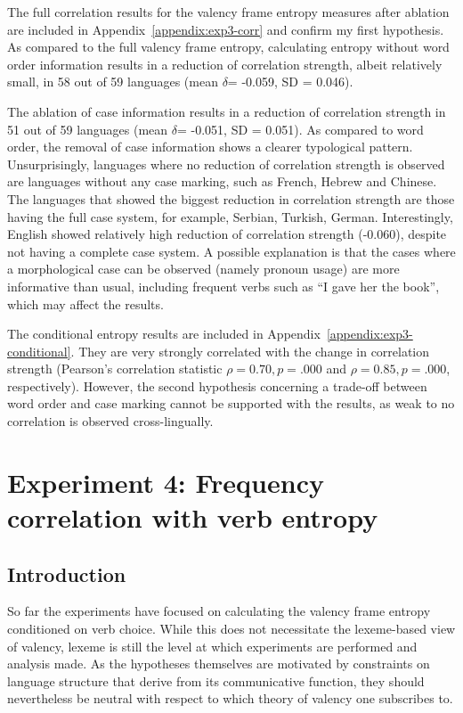 The full correlation results for the valency frame entropy measures after ablation are included in Appendix~\ref{appendix:exp3-corr} and confirm my first hypothesis. As compared to the full valency frame entropy, calculating entropy without word order information results in a reduction of correlation strength, albeit relatively small, in 58 out of 59 languages (mean $\delta$= -0.059, SD = 0.046).

The ablation of case information results in a reduction of correlation strength in 51 out of 59 languages (mean $\delta$= -0.051, SD = 0.051). As compared to word order, the removal of case information shows a clearer typological pattern. Unsurprisingly, languages where no reduction of correlation strength is observed are languages without any case marking, such as French, Hebrew and Chinese. The languages that showed the biggest reduction in correlation strength are those having the full case system, for example, Serbian, Turkish, German. Interestingly, English showed relatively high reduction of correlation strength (-0.060), despite not having a complete case system. A possible explanation is that the cases where a morphological case can be observed (namely pronoun usage) are more informative than usual, including frequent verbs such as ``I gave her the book'', which may affect the results.

The conditional entropy results are included in Appendix~\ref{appendix:exp3-conditional}. They are very strongly correlated with the change in correlation strength (Pearson's correlation statistic $\rho=0.70, p=.000$ and  $\rho=0.85, p=.000$, respectively). However, the second hypothesis concerning a trade-off between word order and case marking cannot be supported with the results, as weak to no correlation is observed cross-lingually.

\section{Experiment 4: Frequency correlation with verb entropy}\label{sec:exp4-verb-entropy}

\subsection{Introduction}

So far the experiments have focused on calculating the valency frame entropy conditioned on verb choice. While this does not necessitate the lexeme-based view of valency, lexeme is still the level at which experiments are performed and analysis made. As the hypotheses themselves are motivated by constraints on language structure that derive from its communicative function, they should nevertheless be neutral with respect to which theory of valency one subscribes to. 

